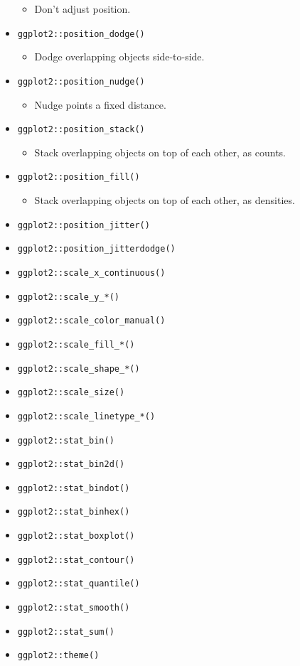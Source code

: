 \documentclass[
]{book}
\providecommand{\tightlist}{%
  \setlength{\itemsep}{0pt}\setlength{\parskip}{0pt}}
\begin{document}
\begin{itemize}
  \begin{itemize}
  \tightlist
  \item
    Don't adjust position.
  \end{itemize}
\item
  \texttt{ggplot2::position\_dodge()}

  \begin{itemize}
  \tightlist
  \item
    Dodge overlapping objects side-to-side.
  \end{itemize}
\item
  \texttt{ggplot2::position\_nudge()}

  \begin{itemize}
  \tightlist
  \item
    Nudge points a fixed distance.
  \end{itemize}
\item
  \texttt{ggplot2::position\_stack()}

  \begin{itemize}
  \tightlist
  \item
    Stack overlapping objects on top of each other, as counts.
  \end{itemize}
\item
  \texttt{ggplot2::position\_fill()}

  \begin{itemize}
  \tightlist
  \item
    Stack overlapping objects on top of each other, as densities.
  \end{itemize}
\item
  \texttt{ggplot2::position\_jitter()}
\item
  \texttt{ggplot2::position\_jitterdodge()}
\item
  \texttt{ggplot2::scale\_x\_continuous()}
\item
  \texttt{ggplot2::scale\_y\_*()}
\item
  \texttt{ggplot2::scale\_color\_manual()}
\item
  \texttt{ggplot2::scale\_fill\_*()}
\item
  \texttt{ggplot2::scale\_shape\_*()}
\item
  \texttt{ggplot2::scale\_size()}
\item
  \texttt{ggplot2::scale\_linetype\_*()}
\item
  \texttt{ggplot2::stat\_bin()}
\item
  \texttt{ggplot2::stat\_bin2d()}
\item
  \texttt{ggplot2::stat\_bindot()}
\item
  \texttt{ggplot2::stat\_binhex()}
\item
  \texttt{ggplot2::stat\_boxplot()}
\item
  \texttt{ggplot2::stat\_contour()}
\item
  \texttt{ggplot2::stat\_quantile()}
\item
  \texttt{ggplot2::stat\_smooth()}
\item
  \texttt{ggplot2::stat\_sum()}
\item
  \texttt{ggplot2::theme()}


\end{itemize}
\end{document}
